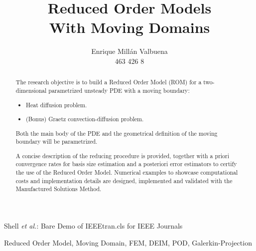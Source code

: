 \documentclass[a4paper, technote, compsoc]{IEEEtran}
\begin{document}
\title{Reduced Order Models \\ With Moving Domains}

\author{Enrique Millán Valbuena \\ \normalsize{463 426 8}}%
        
{Shell \MakeLowercase{\textit{et al.}}: Bare Demo of IEEEtran.cls for IEEE Journals}

\maketitle

\begin{abstract}
   The research objective is to build a Reduced Order Model (ROM) for a two-dimensional parametrized unsteady PDE with a moving boundary:
   \begin{itemize}
      \item Heat diffusion problem.
      \item (Bonus) Graetz convection-diffusion problem.
   \end{itemize}
   Both the main body of the PDE and the geometrical definition of the moving boundary will be parametrized.

   A concise description of the reducing procedure is provided, together with a priori convergence rates for basis size estimation and a posteriori error estimators to certify the use of the Reduced Order Model.
   Numerical examples to showcase computational costs and implementation details are designed, implemented and validated with the Manufactured Solutions Method. 
\end{abstract}

\begin{IEEEkeywords}
    Reduced Order Model, Moving Domain, FEM, DEIM, POD, Galerkin-Projection
\end{IEEEkeywords}
    

% 

% 

\end{document}
